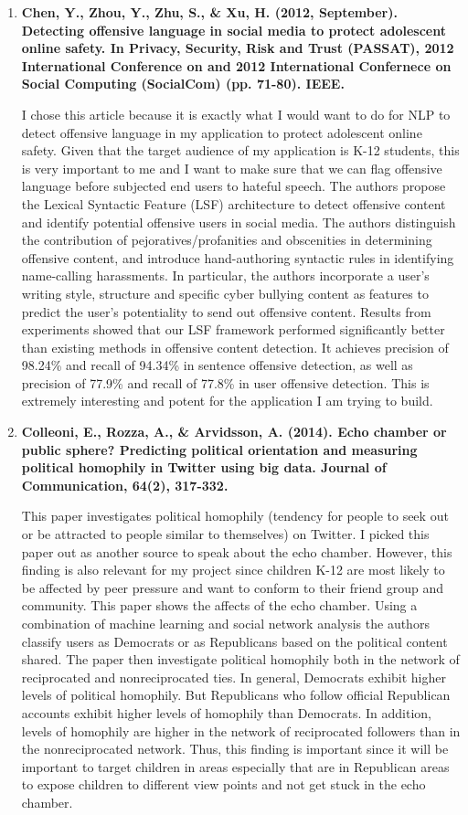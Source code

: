 \documentclass[12pt, final]{article}
\begin{document}
\begin{enumerate}
\item \textbf{Chen, Y., Zhou, Y., Zhu, S., \& Xu, H. (2012, September). Detecting offensive language in social media to protect adolescent online safety. In Privacy, Security, Risk and Trust (PASSAT), 2012 International Conference on and 2012 International Confernece on Social Computing (SocialCom) (pp. 71-80). IEEE.}

I chose this article because it is exactly what I would want to do for NLP to detect offensive language in my application to protect adolescent online safety. Given that the target audience of my application is K-12 students, this is very important to me and I want to make sure that we can flag offensive language before subjected end users to hateful speech. The authors propose the Lexical Syntactic Feature (LSF) architecture to detect offensive content and identify potential offensive users in social media. The authors distinguish the contribution of pejoratives/profanities and obscenities in determining offensive content, and introduce hand-authoring syntactic rules in identifying name-calling harassments. In particular, the authors incorporate a user's writing style, structure and specific cyber bullying content as features to predict the user's potentiality to send out offensive content. Results from experiments showed that our LSF framework performed significantly better than existing methods in offensive content detection. It achieves precision of 98.24\% and recall of 94.34\% in sentence offensive detection, as well as precision of 77.9\% and recall of 77.8\% in user offensive detection. This is extremely interesting and potent for the application I am trying to build.

\item \textbf{Colleoni, E., Rozza, A., \& Arvidsson, A. (2014). Echo chamber or public sphere? Predicting political orientation and measuring political homophily in Twitter using big data. Journal of Communication, 64(2), 317-332.}

This paper investigates political homophily (tendency for people to seek out or be attracted to people similar to themselves) on Twitter. I picked this paper out as another source to speak about the echo chamber. However, this finding is also relevant for my project since children K-12 are most likely to be affected by peer pressure and want to conform to their friend group and community. This paper shows the affects of the echo chamber. Using a combination of machine learning and social network analysis the authors classify users as Democrats or as Republicans based on the political content shared. The paper then investigate political homophily both in the network of reciprocated and nonreciprocated ties. In general, Democrats exhibit higher levels of political homophily. But Republicans who follow official Republican accounts exhibit higher levels of homophily than Democrats. In addition, levels of homophily are higher in the network of reciprocated followers than in the nonreciprocated network. Thus, this finding is important since it will be important to target children in areas especially that are in Republican areas to expose children to different view points and not get stuck in the echo chamber.


\end{enumerate}
\end{document}
